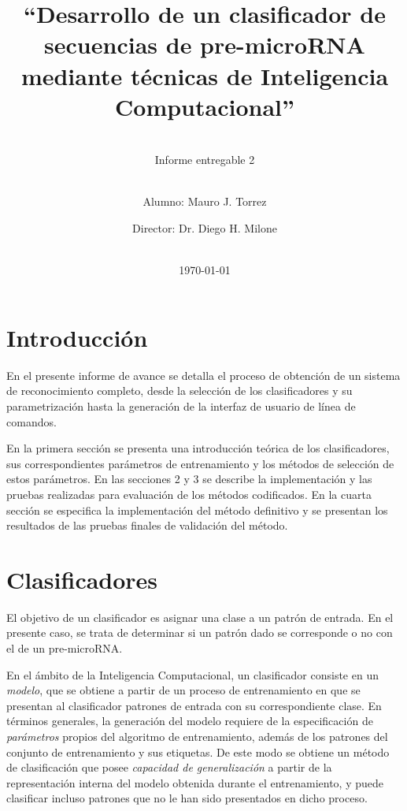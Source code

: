 \documentclass[12pt,bibliography=oldstyle,DIV=12,parskip=half-,titlepage]{scrartcl}
\begin{document}
%
%
\titlehead{\center\large
    Universidad Nacional del Litoral\\
    Facultad de Ingeniería y Ciencias Hídricas
}
%
%
\title{\LARGE ``Desarrollo de un clasificador de secuencias de pre-microRNA
  mediante técnicas de Inteligencia Computacional''}
\subject{Proyecto Final de Carrera\\Ingeniería en
  Informática}
\subtitle{~\\[.2ex]Informe entregable 2\\[.2ex]~}
\author{{Alumno: Mauro J. Torrez}\and{Director: Dr. Diego H. Milone}}
%
\date{~\\[2em]\today}
%
\renewcommand*{\titlepagestyle}{empty}
\maketitle
\setcounter{page}{1}
%
%
%
%
\section*{Introducción}
En el presente informe de avance se detalla el proceso de obtención de
un sistema de reconocimiento completo, desde la selección de los
clasificadores y su parametrización hasta la generación de la interfaz
de usuario de línea de comandos.

En la primera sección se presenta una introducción teórica de los
clasificadores, sus correspondientes parámetros de entrenamiento y los
métodos de selección de estos parámetros. En las secciones 2 y 3 se
describe la implementación y las pruebas realizadas para evaluación de
los métodos codificados. En la cuarta sección se especifica la
implementación del método definitivo y se presentan los resultados de
las pruebas finales de validación del método.
%
%
\section{Clasificadores}
%
El objetivo de un clasificador es asignar una clase a un patrón de
entrada. En el presente caso, se trata de determinar si un patrón dado
se corresponde o no con el de un pre-microRNA.

En el ámbito de la Inteligencia Computacional, un clasificador
consiste en un \emph{modelo}, que se obtiene a partir de un proceso de
entrenamiento en que se presentan al clasificador patrones de entrada
con su correspondiente clase. En términos generales, la generación del
modelo requiere de la especificación de \emph{parámetros} propios del
algoritmo de entrenamiento, además de los patrones del conjunto de
entrenamiento y sus etiquetas. De este modo se obtiene un método de
clasificación que posee \emph{capacidad de generalización} a partir de
la representación interna del modelo obtenida durante el
entrenamiento, y puede clasificar incluso patrones que no le han sido
presentados en dicho proceso.
\end{document}
